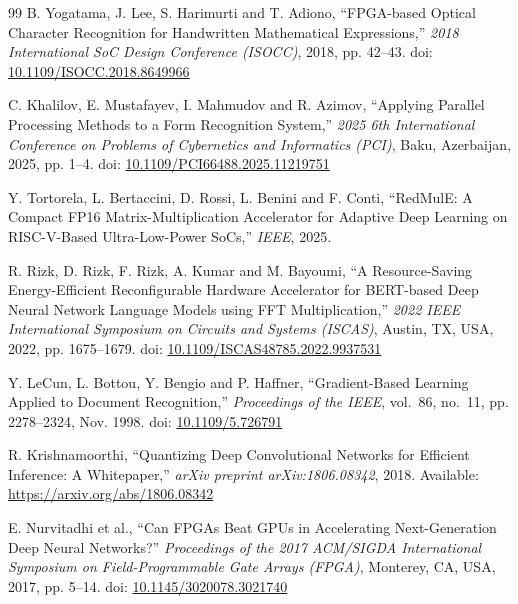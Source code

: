 \documentclass{article}
\begin{document}
\begin{thebibliography}{99}
B. Yogatama, J. Lee, S. Harimurti and T. Adiono,
``FPGA-based Optical Character Recognition for Handwritten Mathematical
Expressions,''
\textit{2018 International SoC Design Conference (ISOCC)},
2018, pp. 42--43.
doi: \href{https://doi.org/10.1109/ISOCC.2018.8649966}
{10.1109/ISOCC.2018.8649966}

C. Khalilov, E. Mustafayev, I. Mahmudov and R. Azimov,
``Applying Parallel Processing Methods to a Form Recognition System,''
\textit{2025 6th International Conference on Problems of Cybernetics and
Informatics (PCI)}, Baku, Azerbaijan, 2025, pp. 1--4.
doi: \href{https://doi.org/10.1109/PCI66488.2025.11219751}
{10.1109/PCI66488.2025.11219751}

Y. Tortorela, L. Bertaccini, D. Rossi, L. Benini and F. Conti,
``RedMulE: A Compact FP16 Matrix-Multiplication Accelerator for Adaptive
Deep Learning on RISC-V-Based Ultra-Low-Power SoCs,''
\textit{IEEE}, 2025.

R. Rizk, D. Rizk, F. Rizk, A. Kumar and M. Bayoumi,
``A Resource-Saving Energy-Efficient Reconfigurable Hardware Accelerator for
BERT-based Deep Neural Network Language Models using FFT Multiplication,''
\textit{2022 IEEE International Symposium on Circuits and Systems (ISCAS)},
Austin, TX, USA, 2022, pp. 1675--1679.
doi: \href{https://doi.org/10.1109/ISCAS48785.2022.9937531}
{10.1109/ISCAS48785.2022.9937531}


Y. LeCun, L. Bottou, Y. Bengio and P. Haffner,
``Gradient-Based Learning Applied to Document Recognition,''
\textit{Proceedings of the IEEE},
vol.~86, no.~11, pp. 2278--2324, Nov. 1998.
doi: \href{https://doi.org/10.1109/5.726791}{10.1109/5.726791}

R. Krishnamoorthi,
``Quantizing Deep Convolutional Networks for Efficient Inference:
A Whitepaper,''
\textit{arXiv preprint arXiv:1806.08342}, 2018.
Available: \url{https://arxiv.org/abs/1806.08342}

E. Nurvitadhi et al.,
``Can FPGAs Beat GPUs in Accelerating Next-Generation Deep Neural Networks?''
\textit{Proceedings of the 2017 ACM/SIGDA International Symposium on
Field-Programmable Gate Arrays (FPGA)},
Monterey, CA, USA, 2017, pp. 5--14.
doi: \href{https://doi.org/10.1145/3020078.3021740}
{10.1145/3020078.3021740}


\end{thebibliography}
\end{document}
